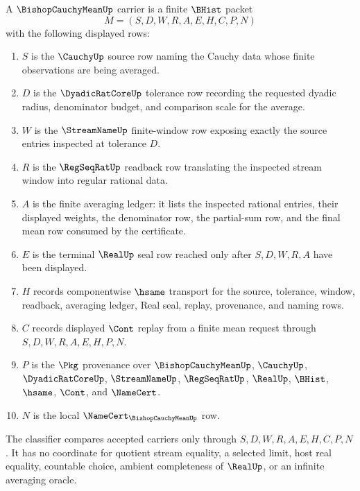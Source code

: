 \begin{definition}
\label{def:bishop-cauchy-mean-carrier}
A $\BishopCauchyMeanUp$ carrier is a finite $\BHist$ packet
$$
M=(S,D,W,R,A,E,H,C,P,N)
$$
with the following displayed rows:
\begin{enumerate}
\item $S$ is the $\CauchyUp$ source row naming the Cauchy data whose finite observations are being averaged.
\item $D$ is the $\DyadicRatCoreUp$ tolerance row recording the requested dyadic radius, denominator budget, and comparison scale for the average.
\item $W$ is the $\StreamNameUp$ finite-window row exposing exactly the source entries inspected at tolerance $D$.
\item $R$ is the $\RegSeqRatUp$ readback row translating the inspected stream window into regular rational data.
\item $A$ is the finite averaging ledger: it lists the inspected rational entries, their displayed weights, the denominator row, the partial-sum row, and the final mean row consumed by the certificate.
\item $E$ is the terminal $\RealUp$ seal row reached only after $S,D,W,R,A$ have been displayed.
\item $H$ records componentwise $\hsame$ transport for the source, tolerance, window, readback, averaging ledger, Real seal, replay, provenance, and naming rows.
\item $C$ records displayed $\Cont$ replay from a finite mean request through $S,D,W,R,A,E,H,P,N$.
\item $P$ is the $\Pkg$ provenance over $\BishopCauchyMeanUp$, $\CauchyUp$, $\DyadicRatCoreUp$, $\StreamNameUp$, $\RegSeqRatUp$, $\RealUp$, $\BHist$, $\hsame$, $\Cont$, and $\NameCert$.
\item $N$ is the local $\NameCert_{\BishopCauchyMeanUp}$ row.
\end{enumerate}
The classifier compares accepted carriers only through $S,D,W,R,A,E,H,C,P,N$. It has no coordinate for quotient stream equality, a selected limit, host real equality, countable choice, ambient completeness of $\RealUp$, or an infinite averaging oracle.
\end{definition}

